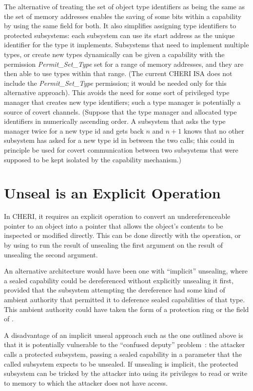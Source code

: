 The alternative of treating the set of object type identifiers as being the
same as the set of memory addresses enables the saving of some bits within
a capability by using the same field for both.
It also simplifies
assigning type identifiers to protected subsystems: each subsystem can
use its start address as the unique identifier for the type it implements.
Subsystems that need to implement multiple types, or create new types
dynamically can be given a capability with the permission
\emph{Permit\_Set\_Type} set for a
range of memory addresses, and they are then able to use types within that
range. (The current CHERI ISA does not include the
\emph{Permit\_Set\_Type} permission;
it would be needed only for this alternative approach). This avoids the need
for some sort of privileged type manager that
creates new type identifiers; such a type manager is potentially a source
of covert channels. (Suppose that the type manager and allocated
type identifiers in numerically ascending order. A subsystem that asks the
type manager twice for a new type id and gets back $n$ and $n+1$ knows that no
other subsystem has asked for a new type id in between the two calls; this
could in principle be used for covert communication between two subsystems
that were supposed to be kept isolated by the capability mechanism.)

\section{Unseal is an Explicit Operation}

In CHERI, it requires an explicit operation to
convert an undereferenceable  pointer to an object into a pointer that
allows the object's contents to be inspected or modified directly.
This can be done directly with the  operation,
or by using  to run the result of unsealing the first
argument on the result of unsealing the second argument.

An alternative architecture would have been one with ``implicit'' unsealing,
where a sealed capability could be dereferenced without
explicitly unsealing it first, provided that the subsystem attempting the
dereference had some kind of ambient authority that permitted it to deference
sealed capabilities of that type. This ambient authority could have taken
the form of a protection ring or the \cotype{} field of \PCC{}.

A disadvantage of an implicit unseal approach such as the one outlined above
is that it is potentially vulnerable to the ``confused deputy''
problem~\cite{Hardy1988}: the attacker calls a protected subsystem, passing
a sealed capability in a parameter that the called subsystem expects to be
unsealed. If unsealing is implicit, the protected subsystem can be tricked
by the attacker into using its privileges to read or write to memory to
which the attacker does not have access.

